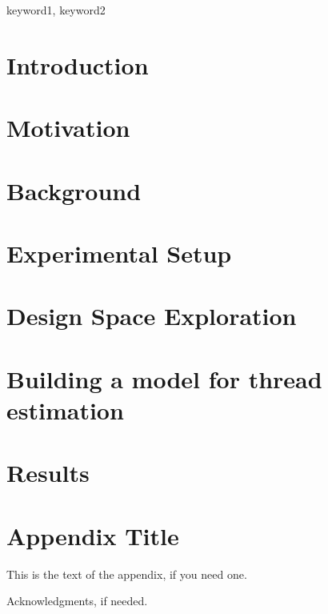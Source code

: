 \documentclass{sigplanconf}
\begin{document}
\keywords
keyword1, keyword2

\section{Introduction}


\section{Motivation}


\section{Background}


\section{Experimental Setup}


\section{Design Space Exploration}


\section{Building a model for thread estimation}




\section{Results}


\appendix
\section{Appendix Title}

This is the text of the appendix, if you need one.

\acks

Acknowledgments, if needed.






\end{document}
